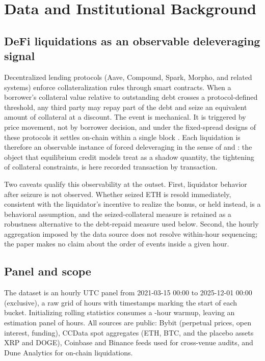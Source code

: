 \section{Data and Institutional Background}
\label{sec:data}

\subsection{DeFi liquidations as an observable deleveraging signal}

Decentralized lending protocols (Aave, Compound, Spark, Morpho, and related
systems) enforce collateralization rules through smart contracts. When a
borrower's collateral value relative to outstanding debt crosses a
protocol-defined threshold, any third party may repay part of the debt and
seize an equivalent amount of collateral at a discount. The event is
mechanical. It is triggered by price movement, not by borrower decision, and
under the fixed-spread designs of these protocols it settles on-chain within
a single block \citep{qin2021}. Each liquidation is
therefore an observable instance of forced deleveraging in the sense of
\citet{geanakoplos2010} and \citet{brunnermeier2009}: the object that
equilibrium credit models treat as a shadow quantity, the tightening of
collateral constraints, is here recorded transaction by transaction.

Two caveats qualify this observability at the outset. First, liquidator
behavior after seizure is not observed. Whether seized ETH is resold
immediately, consistent with the liquidator's incentive to realize the
bonus, or held instead, is a behavioral assumption, and the seized-collateral
measure is retained as a robustness alternative to the debt-repaid measure
used below. Second, the hourly aggregation imposed by the data source does
not resolve within-hour sequencing; the paper makes no claim about the order
of events inside a given hour.

\subsection{Panel and scope}

The dataset is an hourly UTC panel from 2021-03-15 00:00 to 2025-12-01 00:00
(exclusive), a raw grid of \NTotal{} hours with timestamps marking the start
of each bucket. Initializing rolling statistics consumes a \WarmupRows-hour
warmup, leaving an estimation panel of \Nobs{} hours. All sources are
public: Bybit (perpetual prices, open interest, funding), CCData spot
aggregates (ETH, BTC, and the placebo assets XRP and DOGE), Coinbase and
Binance feeds used for cross-venue audits, and Dune Analytics for on-chain
liquidations.

